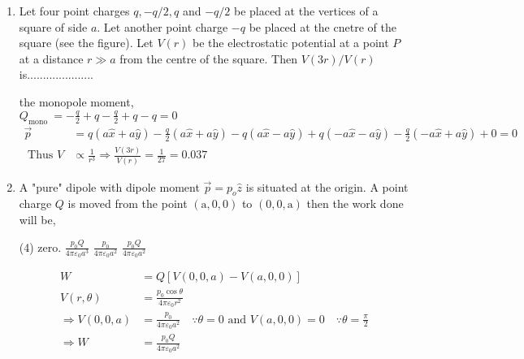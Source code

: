 \begin{enumerate} [label=\color{ocre}\textbf{\arabic*.}]
\begin{answer}
	\begin{align*}
	\vec{E}(r, \theta)&=\frac{p}{4 \pi \varepsilon_{0} r^{3}}(2 \cos \theta \hat{r}+\sin \theta \hat{\theta}) \\
	\tan \alpha&=\frac{E_{\theta}}{E_{r}}=\frac{1}{2} \tan \theta \quad \because \alpha=90-\theta \Rightarrow \cot \theta=\frac{1}{2} \tan \theta \\
	\Rightarrow \tan ^{2} \theta&=2 \Rightarrow \theta=\tan ^{-1} \sqrt{2}
	\end{align*}
	
\end{answer}
\item Let four point charges $q,-q / 2, q$ and $-q / 2$ be placed at the vertices of a square of
side $a$. Let another point charge $-q$ be placed at the cnetre of the square (see the figure).
Let $V(r)$ be the electrostatic potential at a point $P$ at a distance $r \gg a$ from the centre of
the square. Then $V(3 r) / V(r)$ is.....................
\begin{answer} the monopole moment,\\
	  $Q_{\text {mono }}=-\frac{q}{2}+q-\frac{q}{2}+q-q=0$
   \begin{align*}
	\vec{p}&=q(a \hat{x}+a \hat{y})-\frac{q}{2}(a \hat{x}+a \hat{y})-q(a \hat{x}-a \hat{y})+q(-a \hat{x}-a \hat{y})-\frac{q}{2}(-a \hat{x}+a \hat{y})+0=0 \\
	\text { Thus } V &\propto \frac{1}{r^{3}} \Rightarrow \frac{V(3 r)}{V(r)}=\frac{1}{27}=0.037
	\end{align*}
	
\end{answer}
\item A "pure" dipole with dipole moment $\vec{p}=p_{o} \hat{z}$ is situated at the origin. A point charge $Q$ is
moved from the point $(\mathrm{a}, 0,0)$ to $(0,0, \mathrm{a})$ then the work done will be,
\begin{tasks}(4)
	\task[\textbf{a.}]  zero. 
	\task[\textbf{b.}]$\frac{p_{0} Q}{4 \pi \varepsilon_{0} a^{3}}$
	\task[\textbf{c.}] $\frac{p_{0}}{4 \pi \varepsilon_{0} a^{2}}$
	\task[\textbf{d.}] $\frac{p_{0} Q}{4 \pi \varepsilon_{0} a^{2}}$
\end{tasks}
\begin{answer}
	\begin{align*}
    W&=Q[V(0,0, a)-V(a, 0,0)]\\
	V(r, \theta)&=\frac{p_{0} \cos \theta}{4 \pi \varepsilon_{0} r^{2}}\\ \Rightarrow V(0,0, a)&=\frac{p_{0}}{4 \pi \varepsilon_{0} a^{2}} \quad \because \theta=0 \text { and } V(a, 0,0)=0 \quad \because \theta=\frac{\pi}{2}\\
	\Rightarrow W&=\frac{p_{0} Q}{4 \pi \varepsilon_{0} a^{2}}
	\end{align*}
	
\end{answer}

\end{enumerate}




